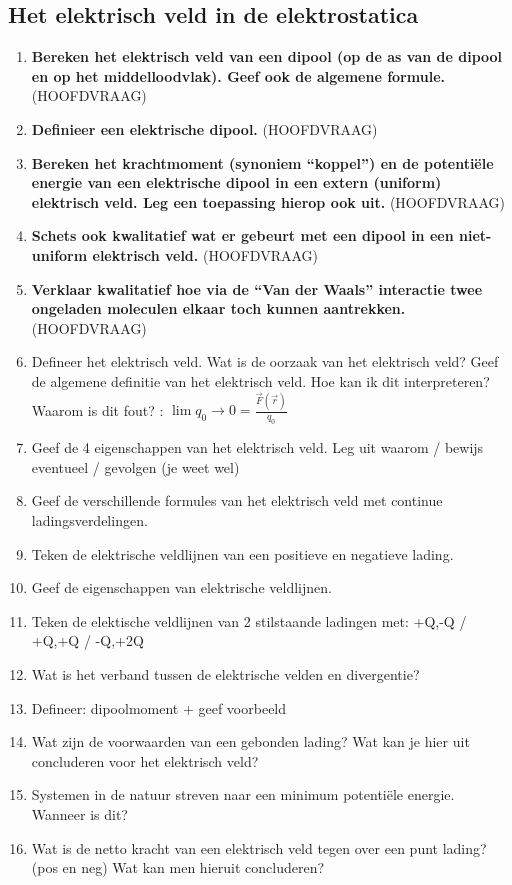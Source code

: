 \documentclass[a4paper,12pt]{article}
\begin{document}
    \subsection{Het elektrisch veld in de elektrostatica}
    \begin{enumerate}
        \item \textbf{Bereken het elektrisch veld van een dipool (op de as van de dipool en op het middelloodvlak). Geef ook de algemene formule.} (HOOFDVRAAG)
        \item \textbf{Definieer een elektrische dipool.} (HOOFDVRAAG)
        \item \textbf{Bereken het krachtmoment (synoniem “koppel”) en de potentiële energie van een elek­trische dipool in een extern (uniform) elektrisch veld. Leg een toepassing hierop ook uit.} (HOOFDVRAAG)
        \item \textbf{Schets ook kwalitatief wat er gebeurt met een dipool in een niet-uniform elektrisch veld.} (HOOFDVRAAG)
        \item \textbf{Verklaar kwalitatief hoe via de “Van der Waals” interactie twee ongeladen moleculen elkaar toch kunnen aantrekken.} (HOOFDVRAAG)
        \item Defineer het elektrisch veld. Wat is de oorzaak van het elektrisch veld? Geef de algemene definitie van het elektrisch veld. Hoe kan ik dit interpreteren? Waarom is dit fout? : $\lim{q_0 \to 0} = \frac{\vec{F}(\vec{r})}{q_0}$
        \item Geef de 4 eigenschappen van het elektrisch veld. Leg uit waarom / bewijs eventueel / gevolgen (je weet wel)
        \item Geef de verschillende formules van het elektrisch veld met continue ladingsverdelingen.
        \item Teken de elektrische veldlijnen van een positieve en negatieve lading.
        \item Geef de eigenschappen van elektrische veldlijnen.
        \item Teken de elektische veldlijnen van 2 stilstaande ladingen met: +Q,-Q / +Q,+Q / -Q,+2Q
        \item Wat is het verband tussen de elektrische velden en divergentie?                                                                             
        \item Defineer: dipoolmoment + geef voorbeeld
        \item Wat zijn de voorwaarden van een gebonden lading? Wat kan je hier uit concluderen voor het elektrisch veld?
        \item Systemen in de natuur streven naar een minimum potentiële energie. Wanneer is dit?
        \item Wat is de netto kracht van een elektrisch veld tegen over een punt lading? (pos en neg) Wat kan men hieruit concluderen?
    \end{enumerate}
\end{document}
